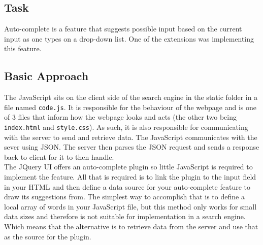 \subsection{Task}
Auto-complete is a feature that suggests possible input based on the current input as one types on a drop-down list. One of the extensions was implementing this feature.

\subsection{Basic Approach}
The JavaScript sits on the client side of the search engine in the static folder in a file named {\tt code.js}. It is responsible for the behaviour of the webpage and is one of 3 files that inform how the webpage looks and acts (the other two being {\tt index.html} and {\tt style.css}).
As such, it is also responsible for communicating with the server to send and retrieve data. The JavaScript communicates with the sever using JSON. The server then parses the JSON request and sends a response back to client for it to then handle.\\
The JQuery UI offers an auto-complete plugin so little JavaScript is required to implement the feature. All that is required is to link the plugin to the input field in your HTML and then define a data source for your auto-complete feature to draw its suggestions from. The simplest way to accomplish that is to define a local array of words in your JavaScript file, but this method only works for small data sizes and therefore is not suitable for implementation in a search engine. Which means that the alternative is to retrieve data from the server and use that as the source for the plugin.

